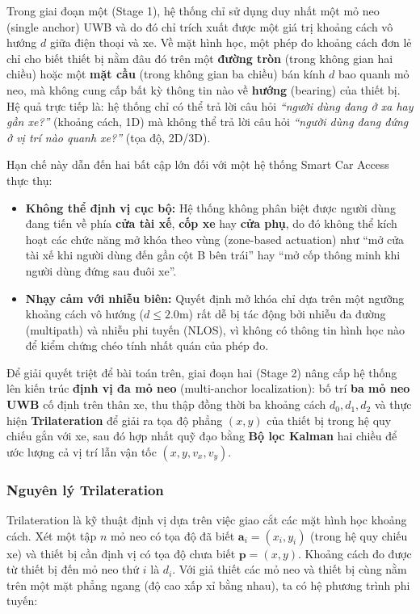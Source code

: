 Trong giai đoạn một (Stage 1), hệ thống chỉ sử dụng duy nhất một mỏ neo (single anchor) UWB và do đó chỉ trích xuất được một giá trị khoảng cách vô hướng $d$ giữa điện thoại và xe. Về mặt hình học, một phép đo khoảng cách đơn lẻ chỉ cho biết thiết bị nằm đâu đó trên một \textbf{đường tròn} (trong không gian hai chiều) hoặc một \textbf{mặt cầu} (trong không gian ba chiều) bán kính $d$ bao quanh mỏ neo, mà không cung cấp bất kỳ thông tin nào về \textbf{hướng} (bearing) của thiết bị. Hệ quả trực tiếp là: hệ thống chỉ có thể trả lời câu hỏi \textit{``người dùng đang ở xa hay gần xe?''} (khoảng cách, 1D) mà không thể trả lời câu hỏi \textit{``người dùng đang đứng ở vị trí nào quanh xe?''} (tọa độ, 2D/3D).

Hạn chế này dẫn đến hai bất cập lớn đối với một hệ thống Smart Car Access thực thụ:
\begin{itemize}
    \item \textbf{Không thể định vị cục bộ:} Hệ thống không phân biệt được người dùng đang tiến về phía \textbf{cửa tài xế}, \textbf{cốp xe} hay \textbf{cửa phụ}, do đó không thể kích hoạt các chức năng mở khóa theo vùng (zone-based actuation) như ``mở cửa tài xế khi người dùng đến gần cột B bên trái'' hay ``mở cốp thông minh khi người dùng đứng sau đuôi xe''.
    \item \textbf{Nhạy cảm với nhiễu biên:} Quyết định mở khóa chỉ dựa trên một ngưỡng khoảng cách vô hướng ($d \le 2.0$m) rất dễ bị tác động bởi nhiễu đa đường (multipath) và nhiễu phi tuyến (NLOS), vì không có thông tin hình học nào để kiểm chứng chéo tính nhất quán của phép đo.
\end{itemize}

Để giải quyết triệt để bài toán trên, giai đoạn hai (Stage 2) nâng cấp hệ thống lên kiến trúc \textbf{định vị đa mỏ neo} (multi-anchor localization): bố trí \textbf{ba mỏ neo UWB} cố định trên thân xe, thu thập đồng thời ba khoảng cách $d_0, d_1, d_2$ và thực hiện \textbf{Trilateration} để giải ra tọa độ phẳng $(x, y)$ của thiết bị trong hệ quy chiếu gắn với xe, sau đó hợp nhất quỹ đạo bằng \textbf{Bộ lọc Kalman} hai chiều để ước lượng cả vị trí lẫn vận tốc $(x, y, v_x, v_y)$.

\subsubsection{Nguyên lý Trilateration}

Trilateration là kỹ thuật định vị dựa trên việc giao cắt các mặt hình học khoảng cách. Xét một tập $n$ mỏ neo có tọa độ đã biết $\mathbf{a}_i = (x_i, y_i)$ (trong hệ quy chiếu xe) và thiết bị cần định vị có tọa độ chưa biết $\mathbf{p} = (x, y)$. Khoảng cách đo được từ thiết bị đến mỏ neo thứ $i$ là $d_i$. Với giả thiết các mỏ neo và thiết bị cùng nằm trên một mặt phẳng ngang (độ cao xấp xỉ bằng nhau), ta có hệ phương trình phi tuyến:

